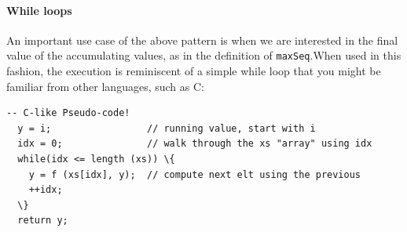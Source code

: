 \paragraph*{While loops} An important use case of the above pattern is
when we are interested in the final value of the accumulating values,
as in the definition of {\tt maxSeq}.\indRIndex\indWhileLoop When used
in this fashion, the execution is reminiscent of a simple while loop
that you might be familiar from other languages, such as C:
\begin{Verbatim}[commandchars=\\\{\}, codes={\catcode`$=3\catcode`^=7\catcode`_=8}]
  -- C-like Pseudo-code!
  y = i;                 // running value, start with i
  idx = 0;               // walk through the xs "array" using idx
  while(idx <= length (xs)) \{
    y = f (xs[idx], y);  // compute next elt using the previous
    ++idx;
  \}
  return y;
\end{Verbatim}

